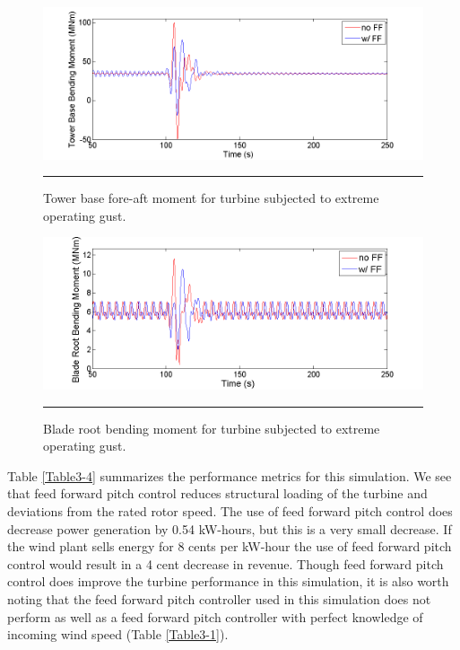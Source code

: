 \begin{figure}[htbp]
	\centering
		\includegraphics[trim = {1cm 0 2cm 0}, clip, width = \linewidth]{Figures/ch3Figures/fig3-28.png}
		\rule{35em}{0.5pt}
	\caption{Tower base fore-aft moment for turbine subjected to extreme operating gust.}
	\label{fig3-28}
\end{figure}

\begin{figure}[htbp]
	\centering
		\includegraphics[trim = {1cm 0 2cm 0}, clip, width = \linewidth]{Figures/ch3Figures/fig3-29.png}
		\rule{35em}{0.5pt}
	\caption{Blade root bending moment for turbine subjected to extreme operating gust.}
	\label{fig3-29}
\end{figure}

Table \ref{Table3-4} summarizes the performance metrics for this simulation. We see that feed forward pitch control reduces structural loading of the turbine and deviations from the rated rotor speed. The use of feed forward pitch control does decrease power generation by 0.54 kW-hours, but this is a very small decrease. If the wind plant sells energy for 8 cents per kW-hour the use of feed forward pitch control would result in a 4 cent decrease in revenue. Though feed forward pitch control does improve the turbine performance in this simulation, it is also worth noting that the feed forward pitch controller used in this simulation does not perform as well as a feed forward pitch controller with perfect knowledge of incoming wind speed (Table \ref{Table3-1}).

